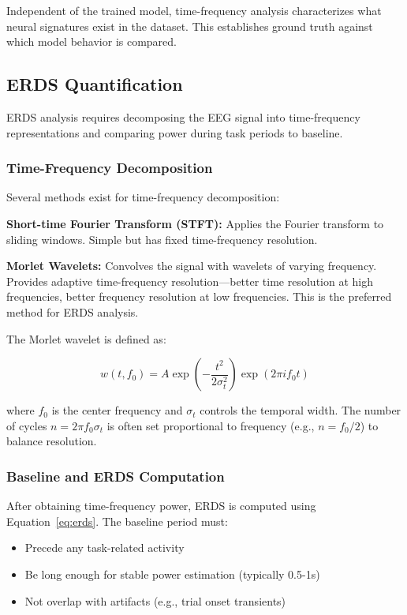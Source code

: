 Independent of the trained model, time-frequency analysis characterizes what neural signatures exist in the dataset. This establishes ground truth against which model behavior is compared.


\subsection{ERDS Quantification}
\label{subsec:bg_erds_methods}

ERDS analysis requires decomposing the EEG signal into time-frequency representations and comparing power during task periods to baseline.

\subsubsection{Time-Frequency Decomposition}

Several methods exist for time-frequency decomposition:

\textbf{Short-time Fourier Transform (STFT):} Applies the Fourier transform to sliding windows. Simple but has fixed time-frequency resolution.

\textbf{Morlet Wavelets:} Convolves the signal with wavelets of varying frequency. Provides adaptive time-frequency resolution—better time resolution at high frequencies, better frequency resolution at low frequencies. This is the preferred method for ERDS analysis.

The Morlet wavelet is defined as:

\begin{equation}
    w(t, f_0) = A \exp\left(-\frac{t^2}{2\sigma_t^2}\right) \exp(2\pi i f_0 t)
    \label{eq:wavelet}
\end{equation}

where $f_0$ is the center frequency and $\sigma_t$ controls the temporal width. The number of cycles $n = 2\pi f_0 \sigma_t$ is often set proportional to frequency (e.g., $n = f_0 / 2$) to balance resolution.

\subsubsection{Baseline and ERDS Computation}

After obtaining time-frequency power, ERDS is computed using Equation~\ref{eq:erds}. The baseline period must:

\begin{itemize}
    \item Precede any task-related activity
    \item Be long enough for stable power estimation (typically 0.5-1s)
    \item Not overlap with artifacts (e.g., trial onset transients)
\end{itemize}

